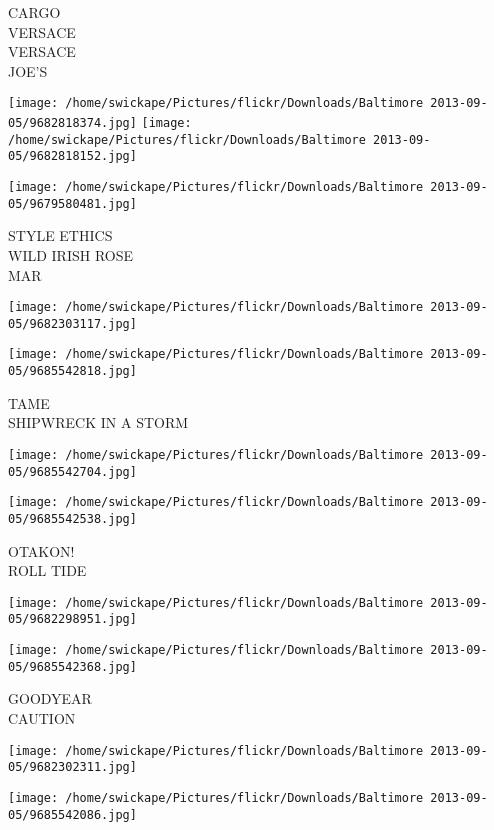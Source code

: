 \documentclass[10pt,letterpaper]{article}
\begin{document}
CARGO\\
VERSACE\\
VERSACE\\
JOE'S
\pagebreak

\texttt{[image: /home/swickape/Pictures/flickr/Downloads/Baltimore 2013-09-05/9682818374.jpg]}
\texttt{[image: /home/swickape/Pictures/flickr/Downloads/Baltimore 2013-09-05/9682818152.jpg]}

\texttt{[image: /home/swickape/Pictures/flickr/Downloads/Baltimore 2013-09-05/9679580481.jpg]}

STYLE ETHICS\\
WILD IRISH ROSE\\
MAR
\pagebreak

\texttt{[image: /home/swickape/Pictures/flickr/Downloads/Baltimore 2013-09-05/9682303117.jpg]}

\vspace{0.25in}
\texttt{[image: /home/swickape/Pictures/flickr/Downloads/Baltimore 2013-09-05/9685542818.jpg]}

TAME\\
SHIPWRECK IN A STORM
\pagebreak

\texttt{[image: /home/swickape/Pictures/flickr/Downloads/Baltimore 2013-09-05/9685542704.jpg]}

\vspace{0.25in}
\texttt{[image: /home/swickape/Pictures/flickr/Downloads/Baltimore 2013-09-05/9685542538.jpg]}

OTAKON!\\
ROLL TIDE
\pagebreak

\texttt{[image: /home/swickape/Pictures/flickr/Downloads/Baltimore 2013-09-05/9682298951.jpg]}

\vspace{0.25in}
\texttt{[image: /home/swickape/Pictures/flickr/Downloads/Baltimore 2013-09-05/9685542368.jpg]}

GOODYEAR\\
CAUTION
\pagebreak

\texttt{[image: /home/swickape/Pictures/flickr/Downloads/Baltimore 2013-09-05/9682302311.jpg]}

\vspace{0.25in}
\texttt{[image: /home/swickape/Pictures/flickr/Downloads/Baltimore 2013-09-05/9685542086.jpg]}
\end{document}

